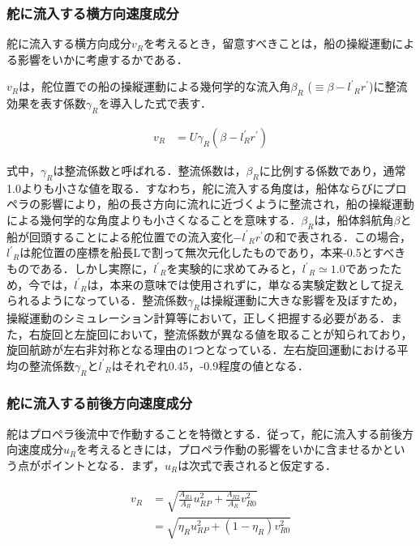 \subsubsection{舵に流入する横方向速度成分}
舵に流入する横方向成分$v_R$を考えるとき，留意すべきことは，船の操縦運動による影響をいかに考慮するかである．

$v_R$は，舵位置での船の操縦運動による幾何学的な流入角$\beta_R$ ($\equiv \beta-{l^{\prime}}_R  r^{\prime}$)に整流効果を表す係数$\gamma_R$を導入した式で表す．

\begin{align}
    v_R &= U \gamma_R (\beta - {l^{\prime}_R} r^{\prime}) \label{eq:2-38}
\end{align}

式中，$\gamma_R$は整流係数と呼ばれる．整流係数は，$\beta_R$に比例する係数であり，通常1.0よりも小さな値を取る．すなわち，舵に流入する角度は，船体ならびにプロペラの影響により，船の長さ方向に流れに近づくように整流され，船の操縦運動による幾何学的な角度よりも小さくなることを意味する．$\beta_R$は，船体斜航角$\beta$と船が回頭することによる舵位置での流入変化$-{l^{\prime}}_R  r^{\prime}$の和で表される．この場合，${l^{\prime}}_R $は舵位置の座標を船長Lで割って無次元化したものであり，本来-0.5とすべきものである．しかし実際に，${l^{\prime}}_R $を実験的に求めてみると，${l^{\prime}}_R \simeq 1.0 $であったため，今では，${l^{\prime}}_R $は，本来の意味では使用されずに，単なる実験定数として捉えられるようになっている．整流係数$\gamma_R$は操縦運動に大きな影響を及ぼすため，操縦運動のシミュレーション計算等において，正しく把握する必要がある．また，右旋回と左旋回において，整流係数が異なる値を取ることが知られており，旋回航跡が左右非対称となる理由の1つとなっている．左右旋回運動における平均の整流係数$\gamma_R$と${l^{\prime}}_R $はそれぞれ0.45，-0.9程度の値となる．

\subsubsection{舵に流入する前後方向速度成分}

舵はプロペラ後流中で作動することを特徴とする．従って，舵に流入する前後方向速度成分$u_R$を考えるときには，プロペラ作動の影響をいかに含ませるかという点がポイントとなる．まず，$u_R$は次式で表されると仮定する．

\begin{align}
    \begin{split}
        v_{R}&=\sqrt{\frac{A_{R 1}}{A_{R}} u_{R P}^{2}+\frac{A_{R 2}}{A_{R}} v_{R 0}^{2}} \\
        &=\sqrt{\eta_{R} u_{R P}^{2}+\left(1-\eta_{R}\right) v_{R 0}^{2}} \label{eq:2-39}
    \end{split}
\end{align}


